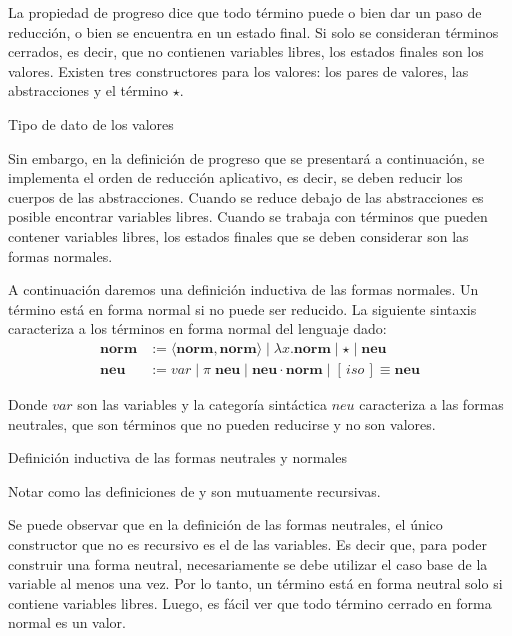 La propiedad de progreso dice que todo término puede o bien dar un paso de reducción, o bien se encuentra en un estado final.
Si solo se consideran términos cerrados, es decir, que no contienen variables libres, los estados finales son los valores.
Existen tres constructores para los valores: los pares de valores, las abstracciones y el término $\star$.

\begin{codigo}
	Tipo de dato de los valores
\end{codigo}

Sin embargo, en la definición de progreso que se presentará a continuación, se implementa el orden de reducción aplicativo, es decir, se deben reducir los cuerpos de las abstracciones.
Cuando se reduce debajo de las abstracciones es posible encontrar variables libres.
Cuando se trabaja con términos que pueden contener variables libres, los estados finales que se deben considerar son las formas normales.

A continuación daremos una definición inductiva de las formas normales. Un término está en forma normal si no puede ser reducido. La siguiente sintaxis caracteriza a los términos en forma normal del lenguaje dado: 
\begin{align*}
	\textbf{norm} &:= \langle \textbf{norm}, \textbf{norm} \rangle \mid \lambda x. \textbf{norm} \mid \star \mid \textbf{neu} \\
	\textbf{neu} &:= var \mid \pi\; \textbf{neu} \mid \textbf{neu} \cdot \textbf{norm} \mid [\, iso \,]\!\!\equiv \textbf{neu}
\end{align*}

Donde $var$ son las variables y la categoría sintáctica $neu$ caracteriza a las formas neutrales, que son términos que no pueden reducirse y no son valores.

\begin{codigo}
	Definición inductiva de las formas neutrales y normales
\end{codigo}

Notar como las definiciones de \type{$\Uparrow$} y \type{$\Downarrow$} son mutuamente recursivas.

Se puede observar que en la definición de las formas neutrales, el único constructor que no es recursivo es el de las variables.
Es decir que, para poder construir una forma neutral, necesariamente se debe utilizar el caso base de la variable al menos una vez.
Por lo tanto, un término está en forma neutral solo si contiene variables libres.
Luego, es fácil ver que todo término cerrado en forma normal es un valor.

